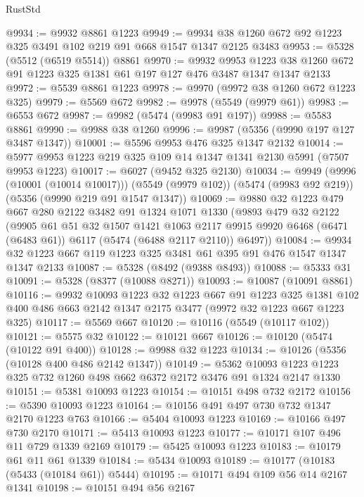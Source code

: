 \begin{lexlean}{RustStd}
\begin{coremodule}
@9934 := @9932 @8861 @1223
@9949 := @9934 @38 @1260 @672 @92 @1223 @325 @3491 @102 @219 @91 @668 @1547 @1347 @2125 @3483
@9953 := @5328 (@5512 (@6519 @5514)) @8861
@9970 := @9932
    @9953
    @1223
    @38
    @1260
    @672
    @91
    @1223
    @325
    @1381
    @61
    @197
    @127
    @476
    @3487
    @1347
    @1347
    @2133
@9972 := @5539 @8861 @1223
@9978 := @9970 (@9972 @38 @1260 @672 @1223 @325)
@9979 := @5569 @672
@9982 := @9978 (@5549 (@9979 @61))
@9983 := @6553 @672
@9987 := @9982 (@5474 (@9983 @91 @197))
@9988 := @5583 @8861
@9990 := @9988 @38 @1260
@9996 := @9987 (@5356 (@9990 @197 @127 @3487 @1347))
@10001 := @5596 @9953 @476 @325 @1347 @2132
@10014 := @5977 @9953 @1223 @219 @325 @109 @14 @1347 @1341 @2130 @5991 (@7507 @9953 @1223)
@10017 := @6027 (@9452 @325 @2130)
@10034 := @9949
    (@9996 (@10001 (@10014 @10017)))
    (@5549 (@9979 @102))
    (@5474 (@9983 @92 @219))
    (@5356 (@9990 @219 @91 @1547 @1347))
@10069 := @9880
    @32
    @1223
    @479
    @667
    @280
    @2122
    @3482
    @91
    @1324
    @1071
    @1330
    (@9893
      @479
      @32
      @2122
      (@9905
        @61
        @51
        @32
        @1507
        @1421
        @1063
        @2117
        @9915
        @9920
        @6468
        (@6471 (@6483 @61))
        @6117
        (@5474 (@6488 @2117 @2110))
        @6497))
@10084 := @9934 @32 @1223 @667 @119 @1223 @325 @3481 @61 @395 @91 @476 @1547 @1347 @1347 @2133
@10087 := @5328 (@8492 (@9388 @8493))
@10088 := @5333 @31
@10091 := @5328 (@8377 (@10088 @8271))
@10093 := @10087 (@10091 @8861)
@10116 := @9932
    @10093
    @1223
    @32
    @1223
    @667
    @91
    @1223
    @325
    @1381
    @102
    @400
    @486
    @663
    @2142
    @1347
    @2175
    @3477
    (@9972 @32 @1223 @667 @1223 @325)
@10117 := @5569 @667
@10120 := @10116 (@5549 (@10117 @102))
@10121 := @5575 @32
@10122 := @10121 @667
@10126 := @10120 (@5474 (@10122 @91 @400))
@10128 := @9988 @32 @1223
@10134 := @10126 (@5356 (@10128 @400 @486 @2142 @1347))
@10149 := @5362 @10093 @1223 @1223 @325 @732 @1260 @498 @662 @6372 @2172 @3476 @91 @1324 @2147 @1330
@10151 := @5381 @10093 @1223
@10154 := @10151 @498 @732 @2172
@10156 := @5390 @10093 @1223
@10164 := @10156 @491 @497 @730 @732 @1347 @2170 @1223 @763
@10166 := @5404 @10093 @1223
@10169 := @10166 @497 @730 @2170
@10171 := @5413 @10093 @1223
@10177 := @10171 @107 @496 @11 @729 @1339 @2169
@10179 := @5425 @10093 @1223
@10183 := @10179 @61 @11 @61 @1339
@10184 := @5434 @10093
@10189 := @10177 (@10183 (@5433 (@10184 @61)) @5444)
@10195 := @10171 @494 @109 @56 @14 @2167 @1341
@10198 := @10151 @494 @56 @2167

\end{coremodule}
\end{lexlean}
